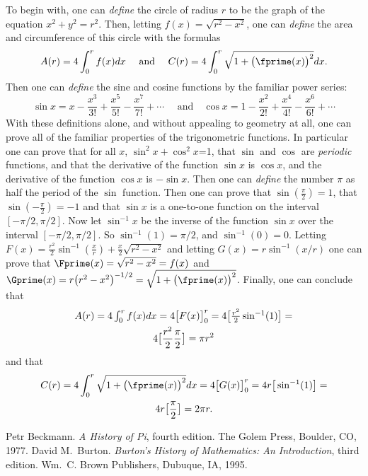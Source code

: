 \documentclass[twoside,twocolumn,12pt]{amsart}
\theoremstyle{plain}
\theoremstyle{definition}
\begin{document}
To begin with, one can \emph{define} the circle of radius $r$ to be the
graph of the equation $x^2+y^2=r^2$. Then, letting $f(x)=\sqrt{r^2-x^2}$,
one can \emph{define} the area and circumference
of this circle with the formulas
$$A(r)=4\int_0^r f(x)dx\quad\text{ and }\quad
C(r)=4\int_0^r \sqrt{1+ \big(\fprime(x)\big)^2}dx.$$
Then one can \emph{define} the sine and cosine functions by the
familiar power series:
$$
\sin x =x-\frac{x^3}{3!}+\frac{x^5}{5!}-\frac{x^7}{7!}+\cdots
\quad\text{ and}\quad
\cos x =1-\frac{x^2}{2!}+\frac{x^4}{4!}-\frac{x^6}{6!}+\cdots
$$
With these definitions alone, and without appealing to geometry at all,
one can prove all of the familiar properties of the trigonometric functions.
In particular one can prove that for all $x$, $\sin^2 x + \cos^2 x$=1,
that $\sin$ and $\cos$ are \emph{periodic} functions, and that
the derivative of the function $\sin x$ is $\cos x$, and the derivative
of the function $\cos x$ is $-\sin x$. Then one can \emph{define} the number
$\pi$ as half the period of the $\sin$ function. Then one can
prove that $\sin(\frac{\pi}{2})=1$, that $\sin(-\frac{\pi}{2})=-1$ and
that $\sin x$ is a one-to-one function on the interval $[-\pi/2,\pi/2]$.
Now let $\sin^{-1} x$ be the inverse of the function $\sin x$ over the
interval $[-\pi/2, \pi/2]$. So $\sin^{-1}(1)=\pi/2$, and $\sin^{-1}(0)=0$.
Letting
$F(x)=\frac{r^2}{2}\sin^{-1}\left(\frac{x}{r}\right)+
\frac{x}{2}\sqrt{r^2-x^2}$
and letting $G(x)=r\sin^{-1}(x/r)$
one can prove that $\Fprime(x)=\sqrt{r^2-x^2}=f(x)$
and $\Gprime(x)=r\big(r^2-x^2\big)^{-1/2}=\sqrt{1+ \big(\fprime(x)\big)^2}$.
Finally, one can conclude that
\begin{multline*}
$$A(r)=4\int_0^{r}f(x)dx=4\big[F(x)\big]_0^r=
4\big[\frac{r^2}{2}\sin^{-1}(1)\big]=\\
4\big[\frac{r^2}{2}\frac{\pi}{2}\big]
=\pi r^2
\end{multline*}
and that
\begin{multline*}
C(r)=4\int_0^r \sqrt{1+ \big(\fprime(x)\big)^2}dx=4\big[G(x)\big]_0^r=
4r\big[\sin^{-1}(1)\big]=\\
4r\big[\frac{\pi}{2}\big]=2\pi r.
\end{multline*}

\begin{thebibliography}{1}
Petr Beckmann. \emph{A History of Pi}, fourth edition.
The Golem Press, Boulder, CO, 1977.
David M.~Burton. \emph{Burton's History of Mathematics: An
Introduction}, third edition. Wm.~C. Brown Publishers, Dubuque, IA, 1995.
\end{thebibliography}
\end{document}
